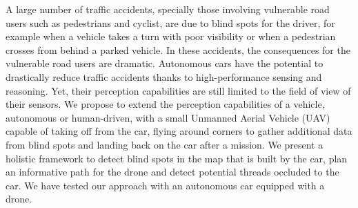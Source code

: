 
A large number of traffic accidents, specially those involving vulnerable road users such as pedestrians and cyclist, are due to blind spots for the driver, for example when a vehicle takes a turn with poor visibility or when a pedestrian crosses from behind a parked vehicle. In these accidents, the consequences for the vulnerable road users are dramatic. Autonomous cars have the potential to drastically reduce traffic accidents thanks to high-performance sensing and reasoning. Yet, their perception capabilities are still limited to the field of view of their sensors.
We propose to extend the perception capabilities of a vehicle, autonomous or human-driven, with a small Unmanned Aerial Vehicle (UAV) capable of taking off from the car, flying around corners to gather additional data from blind spots and landing back on the car after a mission. We present a holistic framework to detect blind spots in the map that is built by the car, plan an informative path for the drone and detect potential threads occluded to the car. We have tested our approach with an autonomous car equipped with a drone.